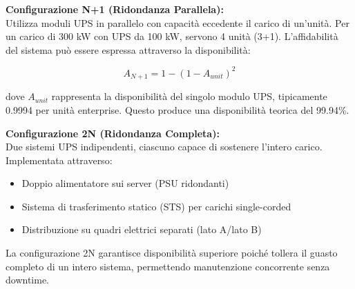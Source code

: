 \textbf{Configurazione N+1 (Ridondanza Parallela):}\\
Utilizza moduli UPS in parallelo con capacità eccedente il carico di un'unità. Per un carico di 300 kW con UPS da 100 kW, servono 4 unità (3+1). L'affidabilità del sistema può essere espressa attraverso la disponibilità:

\begin{equation}
A_{N+1} = 1 - (1 - A_{unit})^2
\end{equation}

dove $A_{unit}$ rappresenta la disponibilità del singolo modulo UPS, tipicamente 0.9994 per unità enterprise\autocite{IEEE2024}. Questo produce una disponibilità teorica del 99.94\%.

\textbf{Configurazione 2N (Ridondanza Completa):}\\
Due sistemi UPS indipendenti, ciascuno capace di sostenere l'intero carico. Implementata attraverso:
\begin{itemize}
    \item Doppio alimentatore sui server (PSU ridondanti)
    \item Sistema di trasferimento statico (STS) per carichi single-corded
    \item Distribuzione su quadri elettrici separati (lato A/lato B)
\end{itemize}

La configurazione 2N garantisce disponibilità superiore poiché tollera il guasto completo di un intero sistema, permettendo manutenzione concorrente senza downtime.

% 


